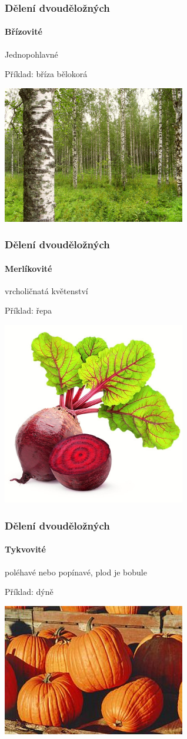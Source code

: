\documentclass{beamer}
\begin{document}
\begin{frame}
\frametitle{Dělení dvouděložných}
	\framesubtitle{Břízovité}Jednopohlavné

Příklad: bříza bělokorá

\begin{center}\includegraphics[width=8cm]{BirkenwaldFinnland.jpg}\end{center}
\end{frame}
\begin{frame}
\frametitle{Dělení dvouděložných}
	\framesubtitle{Merlíkovité}vrcholičnatá květenství

Příklad: řepa

\begin{center}\includegraphics[width=8cm]{ico-cervena-repa.jpg}\end{center}
\end{frame}
\begin{frame}
\frametitle{Dělení dvouděložných}
	\framesubtitle{Tykvovité}poléhavé nebo popínavé, plod je bobule

Příklad: dýně

\begin{center}\includegraphics[width=8cm]{258px-Pumpkins.jpg}\end{center}
\end{frame}
\end{document}
